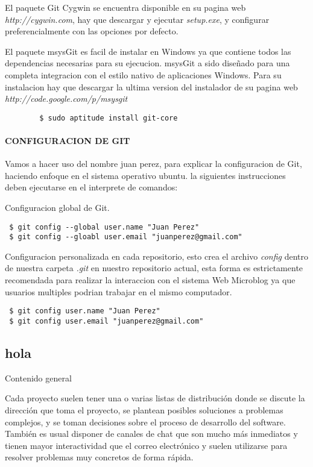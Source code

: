 El paquete Git Cygwin se encuentra disponible en su pagina web \textit{http://cygwin.com}, hay que descargar y ejecutar \textit{setup.exe}, y configurar preferencialmente
con las opciones por defecto.

El paquete msysGit es facil de instalar en Windows ya que contiene todos las dependencias necesarias para su ejecucion. msysGit a sido diseñado para una completa integracion 
con el estilo nativo de aplicaciones Windows. Para su instalacion hay que descargar la ultima version del instalador de su pagina web \textit{http://code.google.com/p/msysgit}

\begin{proc}
	\begin{verbatim}
 		$ sudo aptitude install git-core
	\end{verbatim}
\end{proc}
\paragraph{CONFIGURACION DE GIT}
Vamos a hacer uso del nombre juan perez, para explicar la configuracion de Git, haciendo enfoque en el sistema operativo ubuntu.
la siguientes instrucciones deben ejecutarse en el interprete de comandos:

Configuracion global de Git.
\begin{verbatim}
 $ git config --global user.name "Juan Perez"
 $ git config --gloabl user.email "juanperez@gmail.com"
\end{verbatim}
Configuracion personalizada en cada repositorio, esto crea el archivo \textit{config} dentro de nuestra carpeta \textit{.git} en nuestro repositorio actual, esta forma es
estrictamente recomendada para realizar la interaccion con el sistema Web Microblog ya que usuarios multiples podrian trabajar en el mismo computador.
\begin{verbatim}
 $ git config user.name "Juan Perez"
 $ git config user.email "juanperez@gmail.com"
\end{verbatim}

\subsection{hola}
%

Contenido general

Cada proyecto suelen tener una o varias listas de
distribución donde se discute la dirección que toma el
proyecto, se plantean posibles soluciones a problemas
complejos, y se toman decisiones sobre el proceso de
desarrollo del software. También es usual disponer de
canales de chat que son mucho más inmediatos y
tienen mayor interactividad que el correo electrónico y
suelen utilizarse para resolver problemas muy
concretos de forma rápida.
